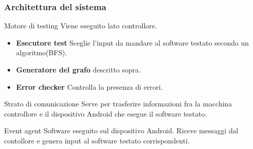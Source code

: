 \documentclass[12pt]{beamer}
\begin{document}
\begin{frame}
    \frametitle{Architettura del sistema}
    \begin{block}{Motore di testing}
        Viene eseguito lato controllore.
        \begin{itemize}
            \item \textbf{Esecutore test} Sceglie l'input da mandare al software testato secondo un algoritmo(BFS).
            \item \textbf{Generatore del grafo} descritto sopra.
            \item \textbf{Error checker} Controlla la presenza di errori.
        \end{itemize}
    \end{block}
    \begin{block}{Strato di comunicazione}
        Serve per trasferire informazioni fra la macchina controllore e il dispositivo Android che esegue il software testato.
    \end{block}
    \begin{block}{Event agent}
        Software eseguito sul dispositivo Android. Riceve messaggi dal contollore e genera input al software testato corrispondenti.
    \end{block}
\end{frame}

\end{document}
